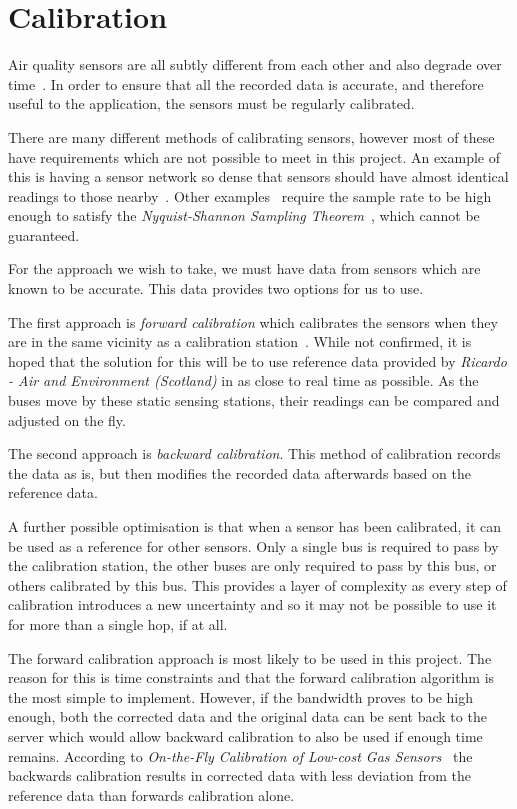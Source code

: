 \section{Calibration}\label{calibration}

Air quality sensors are all subtly different from each other and also degrade over time~\cite{ontheflycalibration}. In order to ensure that all the recorded data is accurate, and therefore useful to the application, the sensors must be regularly calibrated. 

There are many different methods of calibrating sensors, however most of these have requirements which are not possible to meet in this project. An example of this is having a sensor network so dense that sensors should have almost identical readings to those nearby~\cite{collaborativeinplacecalibration}. Other examples~\cite{blindcalibration} require the sample rate to be high enough to satisfy the \emph{Nyquist-Shannon Sampling Theorem}~\cite{samplingtheoremorigins}, which cannot be guaranteed. 

For the approach we wish to take, we must have data from sensors which are known to be accurate. This data provides two options for us to use. 

The first approach is \emph{forward calibration} which calibrates the sensors when they are in the same vicinity as a calibration station~\cite{ontheflycalibration}. While not confirmed, it is hoped that the solution for this will be to use reference data provided by \emph{Ricardo - Air and Environment (Scotland)} in as close to real time as possible. As the buses move by these static sensing stations, their readings can be compared and adjusted on the fly. 

The second approach is \emph{backward calibration}. This method of calibration records the data as is, but then modifies the recorded data afterwards based on the reference data. 

A further possible optimisation is that when a sensor has been calibrated, it can be used as a reference for other sensors. Only a single bus is required to pass by the calibration station, the other buses are only required to pass by this bus, or others calibrated by this bus. This provides a layer of complexity as every step of calibration introduces a new uncertainty and so it may not be possible to use it for more than a single hop, if at all. 

The forward calibration approach is most likely to be used in this project. The reason for this is time constraints and that the forward calibration algorithm is the most simple to implement. However, if the bandwidth proves to be high enough, both the corrected data and the original data can be sent back to the server which would allow backward calibration to also be used if enough time remains. According to \emph{On-the-Fly Calibration of Low-cost Gas Sensors}~\cite{ontheflycalibration} the backwards calibration results in corrected data with less deviation from the reference data than forwards calibration alone. 

